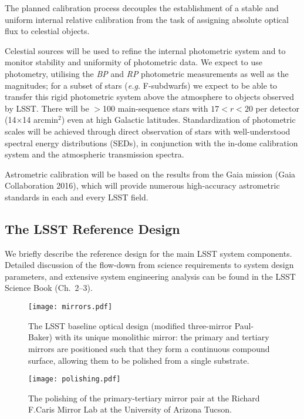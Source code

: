 The planned calibration process decouples the establishment of a stable and uniform internal
relative calibration from the task of assigning absolute optical flux to
celestial objects.

Celestial sources will be used to refine the internal photometric system and
to monitor stability and uniformity of photometric data. We expect to use \cite{Gaia2016} photometry, utilising
the \textit{BP} and \textit{RP} photometric measurements as well as the  magnitudes; for a subset
of stars (\textit{e.g.} F-subdwarfs) we expect to be able to transfer this rigid photometric system above
the atmosphere to objects observed by LSST.
There will be
$>$100 main-sequence stars with $17<r<20$ per detector (14$\times$14 arcmin$^2$)
even at high Galactic latitudes. Standardization of photometric scales will be
achieved through direct observation of stars with well-understood spectral
energy distributions (SEDs), in conjunction with the in-dome calibration system and the atmospheric transmission spectra.

Astrometric calibration will be based on the results from the Gaia mission (Gaia Collaboration 2016), which will provide
numerous high-accuracy astrometric standards in each and every LSST field.

\subsection{     The LSST  Reference Design    }

We briefly describe the reference design for the main LSST system components.
Detailed discussion of the flow-down from science requirements to system
design parameters, and extensive system engineering analysis can be
found in the LSST Science Book (Ch.~2--3).

\begin{figure}
\texttt{[image: mirrors.pdf]}
\caption{The LSST baseline optical design (modified three-mirror
  Paul-Baker) with its unique
monolithic mirror: the primary and tertiary mirrors are positioned such
that they form a continuous compound surface, allowing them to be polished
from a single substrate.}
\label{Fig:optics}
\end{figure}


\begin{figure}
\texttt{[image: polishing.pdf]}
\caption{The polishing of the primary-tertiary mirror pair at the Richard F.Caris Mirror Lab at the University of Arizona Tucson. }
\label{Fig:polishing}
\end{figure}





